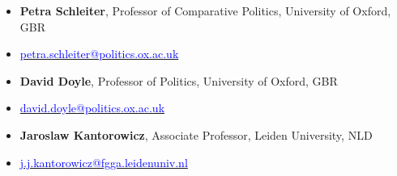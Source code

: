 





\begin{publications}

\begin{itemize}
\item[]{\small {\bfseries Petra Schleiter}, Professor of Comparative Politics, University of Oxford, GBR}
\item[]{\vspace{-1mm}\textcolor{oxfordblue}{\faEnvelope} \hspace{0.1mm} {\small \href{mailto:petra.schleiter@politics.ox.ac.uk}{\textcolor{blue}{petra.schleiter@politics.ox.ac.uk}}}} \vspace{1.5mm}
\item[]{\small {\bfseries David Doyle}, Professor of Politics, University of Oxford, GBR}
\item[]{\vspace{-1mm}\textcolor{oxfordblue}{\faEnvelope} \hspace{0.1mm} {\small \href{mailto:david.doyle@politics.ox.ac.uk}{\textcolor{blue}{david.doyle@politics.ox.ac.uk}}}} \vspace{1.5mm}
\item[]{\small {\bfseries Jaroslaw Kantorowicz}, Associate Professor, Leiden University, NLD}
\item[]{\vspace{-1mm}\textcolor{oxfordblue}{\faEnvelope} \hspace{0.1mm} {\small \href{mailto:j.j.kantorowicz@fgga.leidenuniv.nl}{\textcolor{blue}{j.j.kantorowicz@fgga.leidenuniv.nl}}}} \vspace{1.5mm}
\end{itemize}

\end{publications}
